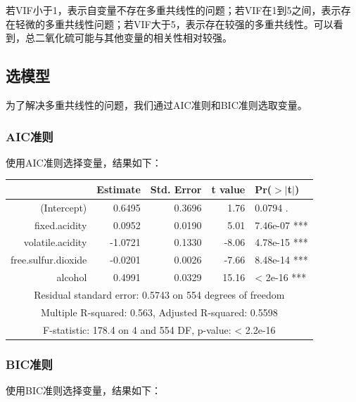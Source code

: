 \documentclass[fontset=ubuntu]{ctexart}
\begin{document}
                若VIF小于1，表示自变量不存在多重共线性的问题；若VIF在1到5之间，表示存在轻微的多重共线性问题；若VIF大于5，表示存在较强的多重共线性。可以看到，总二氧化硫可能与其他变量的相关性相对较强。
        \subsection{选模型}
            为了解决多重共线性的问题，我们通过AIC准则和BIC准则选取变量。
            \subsubsection{AIC准则}
                使用AIC准则选择变量，结果如下：

                \begin{table}[ht]
                    \centering
                    \begin{tabular}{rrrrl}
                        \hline
                        & Estimate & Std. Error & t value & Pr($>$$|$t$|$) \\ 
                        \hline
                        (Intercept) & 0.6495 & 0.3696 & 1.76 & 0.0794 . \\ 
                        fixed.acidity & 0.0952 & 0.0190 & 5.01 & 7.46e-07 *** \\ 
                        volatile.acidity & -1.0721 & 0.1330 & -8.06 & 4.78e-15 *** \\ 
                        free.sulfur.dioxide & -0.0201 & 0.0026 & -7.66 & 8.48e-14 *** \\ 
                        alcohol & 0.4991 & 0.0329 & 15.16 & < 2e-16 *** \\ 
                        \hline
                        \multicolumn{5}{c}{Residual standard error: 0.5743 on 554 degrees of freedom} \\
                        \multicolumn{5}{c}{Multiple R-squared:  0.563,	Adjusted R-squared:  0.5598 } \\
                        \multicolumn{5}{c}{F-statistic: 178.4 on 4 and 554 DF,  p-value: < 2.2e-16} \\
                        \hline
                    \end{tabular}
                \end{table}

            \subsubsection{BIC准则}
                使用BIC准则选择变量，结果如下：
\end{document}

